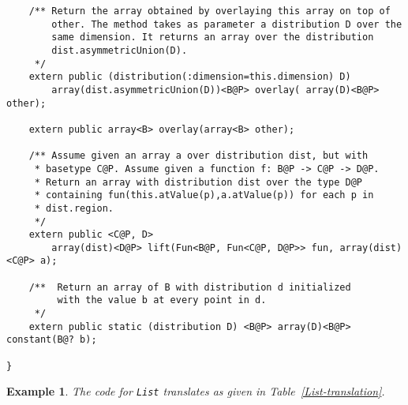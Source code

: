 \documentclass[nocopyrightspace,preprint,9pt]{sigplanconf}
\newtheorem{example}{Example}[section]
\begin{document}
{\begin{verbatim}
    /** Return the array obtained by overlaying this array on top of
        other. The method takes as parameter a distribution D over the
        same dimension. It returns an array over the distribution
        dist.asymmetricUnion(D).
     */
    extern public (distribution(:dimension=this.dimension) D)
        array(dist.asymmetricUnion(D))<B@P> overlay( array(D)<B@P> other);

    extern public array<B> overlay(array<B> other);

    /** Assume given an array a over distribution dist, but with
     * basetype C@P. Assume given a function f: B@P -> C@P -> D@P.
     * Return an array with distribution dist over the type D@P
     * containing fun(this.atValue(p),a.atValue(p)) for each p in
     * dist.region.
     */
    extern public <C@P, D>
        array(dist)<D@P> lift(Fun<B@P, Fun<C@P, D@P>> fun, array(dist)<C@P> a);

    /**  Return an array of B with distribution d initialized
         with the value b at every point in d.
     */
    extern public static (distribution D) <B@P> array(D)<B@P> constant(B@? b);

}
\end{verbatim}}


\begin{example}
 The code for {\tt List} translates as given in Table~\ref{List-translation}.
\end{example}
\end{document}
